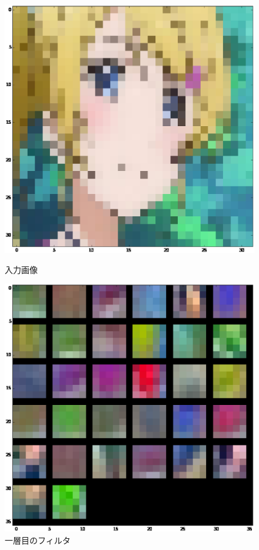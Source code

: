 \documentclass[a4paper,10pt]{jsarticle}
\begin{document}
\begin{figure}[tb]
 \begin{center}
  \includegraphics[clip,width=12cm]{./fig/eps/inputeri.eps}
 \end{center}
 \caption{入力画像}
 \label{inputeri}
 \begin{center}
  \includegraphics[clip,width=12cm]{./fig/eps/filtereri.eps}
 \end{center}
 \caption{一層目のフィルタ}
 \label{filtereri}
\end{figure}
\end{document}

